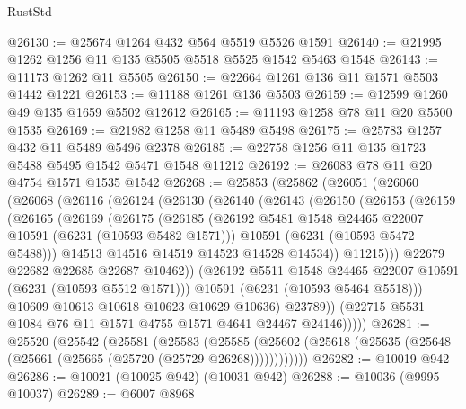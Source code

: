 \begin{lexlean}{RustStd}
\begin{coremodule}
{{@26130 := @25674 @1264 @432 @564 @5519 @5526 @1591
@26140 := @21995 @1262 @1256 @11 @135 @5505 @5518 @5525 @1542 @5463 @1548
@26143 := @11173 @1262 @11 @5505
@26150 := @22664 @1261 @136 @11 @1571 @5503 @1442 @1221
@26153 := @11188 @1261 @136 @5503
@26159 := @12599 @1260 @49 @135 @1659 @5502 @12612
@26165 := @11193 @1258 @78 @11 @20 @5500 @1535
@26169 := @21982 @1258 @11 @5489 @5498
@26175 := @25783 @1257 @432 @11 @5489 @5496 @2378
@26185 := @22758 @1256 @11 @135 @1723 @5488 @5495 @1542 @5471 @1548 @11212
@26192 := @26083 @78 @11 @20 @4754 @1571 @1535 @1542
@26268 := @25853
    (@25862
      (@26051
        (@26060
          (@26068
            (@26116
              (@26124
                (@26130
                  (@26140
                    (@26143
                      (@26150
                        (@26153
                          (@26159
                            (@26165
                              (@26169
                                (@26175
                                  (@26185
                                    (@26192
                                      @5481
                                      @1548
                                      @24465
                                      @22007
                                      @10591
                                      (@6231 (@10593 @5482 @1571)))
                                    @10591
                                    (@6231 (@10593 @5472 @5488)))
                                  @14513
                                  @14516
                                  @14519
                                  @14523
                                  @14528
                                  @14534))
                              @11215)))
                        @22679
                        @22682
                        @22685
                        @22687
                        @10462))
                    (@26192 @5511 @1548 @24465 @22007 @10591 (@6231 (@10593 @5512 @1571)))
                    @10591
                    (@6231 (@10593 @5464 @5518)))
                  @10609
                  @10613
                  @10618
                  @10623
                  @10629
                  @10636)
                @23789))
            (@22715 @5531 @1084 @76 @11 @1571 @4755 @1571 @4641 @24467 @24146)))))
@26281 := @25520
    (@25542
      (@25581
        (@25583
          (@25585 (@25602 (@25618 (@25635 (@25648 (@25661 (@25665 (@25720 (@25729 @26268))))))))))))
@26282 := @10019 @942
@26286 := @10021 (@10025 @942) (@10031 @942)
@26288 := @10036 (@9995 @10037)
@26289 := @6007 @8968
}}
\end{coremodule}
\end{lexlean}
